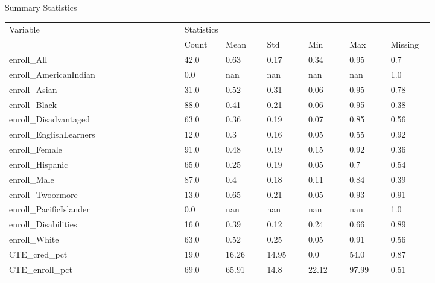 \begin{threeparttable}
    \caption{Summary Statistics} %
\label{tab:summarystats2} %
    \begin{tabular}{ p{0.34\linewidth} p{0.08\linewidth} p{0.08\linewidth} p{0.08\linewidth} p{0.08\linewidth} p{0.08\linewidth} p{0.08\linewidth}}     %
    \toprule %
    Variable                        & \multicolumn{6}{l}{Statistics} \\ %

                       \cmidrule(r){2-7} %
                                    &    Count   &   Mean & Std & Min & Max & Missing  \\ 
\midrule 
 enroll\_All &  42.0  &  0.63 & 0.17 & 0.34 & 0.95 & 0.7  \\ 
 enroll\_AmericanIndian &  0.0  &  nan & nan & nan & nan & 1.0  \\ 
 enroll\_Asian &  31.0  &  0.52 & 0.31 & 0.06 & 0.95 & 0.78  \\ 
 enroll\_Black &  88.0  &  0.41 & 0.21 & 0.06 & 0.95 & 0.38  \\ 
 enroll\_Disadvantaged &  63.0  &  0.36 & 0.19 & 0.07 & 0.85 & 0.56  \\ 
 enroll\_EnglishLearners &  12.0  &  0.3 & 0.16 & 0.05 & 0.55 & 0.92  \\ 
 enroll\_Female &  91.0  &  0.48 & 0.19 & 0.15 & 0.92 & 0.36  \\ 
 enroll\_Hispanic &  65.0  &  0.25 & 0.19 & 0.05 & 0.7 & 0.54  \\ 
 enroll\_Male &  87.0  &  0.4 & 0.18 & 0.11 & 0.84 & 0.39  \\ 
 enroll\_Twoormore &  13.0  &  0.65 & 0.21 & 0.05 & 0.93 & 0.91  \\ 
 enroll\_PacificIslander &  0.0  &  nan & nan & nan & nan & 1.0  \\ 
 enroll\_Disabilities &  16.0  &  0.39 & 0.12 & 0.24 & 0.66 & 0.89  \\ 
 enroll\_White &  63.0  &  0.52 & 0.25 & 0.05 & 0.91 & 0.56  \\ 
 CTE\_cred\_pct &  19.0  &  16.26 & 14.95 & 0.0 & 54.0 & 0.87  \\ 
 CTE\_enroll\_pct &  69.0  &  65.91 & 14.8 & 22.12 & 97.99 & 0.51  \\ 
\midrule
\end{tabular}

\end{threeparttable}